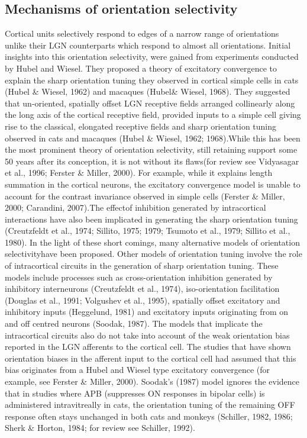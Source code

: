 	\subsection{Mechanisms of orientation selectivity}
	Cortical units selectively respond to edges of a narrow range of orientations unlike their LGN counterparts which respond to almost all orientations. Initial insights into this orientation selectivity, were gained from experiments conducted by Hubel and Wiesel. They proposed a theory of excitatory convergence to explain the sharp orientation tuning they observed in cortical simple cells in cats (Hubel \& Wiesel, 1962) and macaques (Hubel\& Wiesel, 1968). They suggested that un-oriented, spatially offset LGN receptive fields arranged collinearly along the long axis of the cortical receptive field, provided inputs to a simple cell giving rise to the classical, elongated receptive fields and sharp orientation tuning observed in cats and macaques (Hubel \& Wiesel, 1962; 1968).While this has been the most prominent theory of orientation selectivity, still retaining support some 50 years after its conception, it is not without its flaws(for review see Vidyasagar et al., 1996; Ferster \& Miller, 2000). For example, while it explains length summation in the cortical neurons, the excitatory convergence model is unable to account for the contrast invariance observed in simple cells (Ferster \& Miller, 2000; Carandini, 2007).The effectof inhibition generated by intracortical interactions have also been implicated in generating the sharp orientation tuning (Creutzfeldt et al., 1974; Sillito, 1975; 1979; Tsumoto et al., 1979; Sillito et al., 1980). In the light of these short comings, many alternative models of orientation selectivityhave been proposed. 
	Other models of orientation tuning involve the role of intracortical circuits in the generation of sharp orientation tuning. These models include processes such as cross-orientation inhibition generated by inhibitory interneurons (Creutzfeldt et al., 1974), iso-orientation facilitation (Douglas et al., 1991; Volgushev et al., 1995), spatially offset excitatory and inhibitory inputs (Heggelund, 1981) and excitatory inputs originating from on and off centred neurons (Soodak, 1987). The models that implicate the intracortical circuits also do not take into account of the weak orientation bias reported in the LGN afferents to the cortical cell. The studies that have shown orientation biases in the afferent input to the cortical cell had assumed that this bias originates from a Hubel and Wiesel type excitatory convergence (for example, see Ferster \& Miller, 2000). Soodak's (1987) model ignores the evidence that in studies where APB (suppresses ON responses in bipolar cells) is administered intravitreally in cats, the orientation tuning of the remaining OFF response often stays unchanged in both cats and monkeys (Schiller, 1982, 1986; Sherk \& Horton, 1984; for review see Schiller, 1992).
